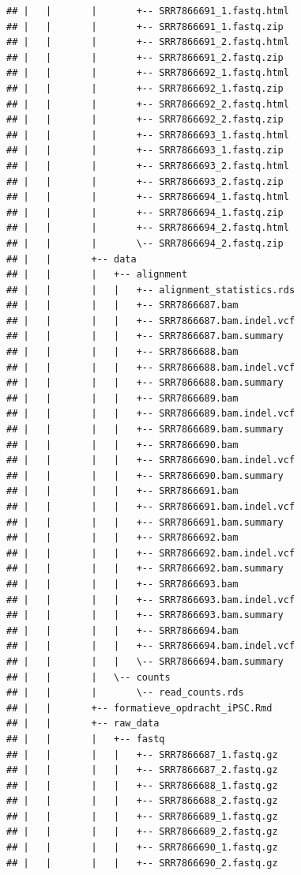\documentclass[
]{book}
\begin{document}
\begin{verbatim}
## |   |       |       +-- SRR7866691_1.fastq.html
## |   |       |       +-- SRR7866691_1.fastq.zip
## |   |       |       +-- SRR7866691_2.fastq.html
## |   |       |       +-- SRR7866691_2.fastq.zip
## |   |       |       +-- SRR7866692_1.fastq.html
## |   |       |       +-- SRR7866692_1.fastq.zip
## |   |       |       +-- SRR7866692_2.fastq.html
## |   |       |       +-- SRR7866692_2.fastq.zip
## |   |       |       +-- SRR7866693_1.fastq.html
## |   |       |       +-- SRR7866693_1.fastq.zip
## |   |       |       +-- SRR7866693_2.fastq.html
## |   |       |       +-- SRR7866693_2.fastq.zip
## |   |       |       +-- SRR7866694_1.fastq.html
## |   |       |       +-- SRR7866694_1.fastq.zip
## |   |       |       +-- SRR7866694_2.fastq.html
## |   |       |       \-- SRR7866694_2.fastq.zip
## |   |       +-- data
## |   |       |   +-- alignment
## |   |       |   |   +-- alignment_statistics.rds
## |   |       |   |   +-- SRR7866687.bam
## |   |       |   |   +-- SRR7866687.bam.indel.vcf
## |   |       |   |   +-- SRR7866687.bam.summary
## |   |       |   |   +-- SRR7866688.bam
## |   |       |   |   +-- SRR7866688.bam.indel.vcf
## |   |       |   |   +-- SRR7866688.bam.summary
## |   |       |   |   +-- SRR7866689.bam
## |   |       |   |   +-- SRR7866689.bam.indel.vcf
## |   |       |   |   +-- SRR7866689.bam.summary
## |   |       |   |   +-- SRR7866690.bam
## |   |       |   |   +-- SRR7866690.bam.indel.vcf
## |   |       |   |   +-- SRR7866690.bam.summary
## |   |       |   |   +-- SRR7866691.bam
## |   |       |   |   +-- SRR7866691.bam.indel.vcf
## |   |       |   |   +-- SRR7866691.bam.summary
## |   |       |   |   +-- SRR7866692.bam
## |   |       |   |   +-- SRR7866692.bam.indel.vcf
## |   |       |   |   +-- SRR7866692.bam.summary
## |   |       |   |   +-- SRR7866693.bam
## |   |       |   |   +-- SRR7866693.bam.indel.vcf
## |   |       |   |   +-- SRR7866693.bam.summary
## |   |       |   |   +-- SRR7866694.bam
## |   |       |   |   +-- SRR7866694.bam.indel.vcf
## |   |       |   |   \-- SRR7866694.bam.summary
## |   |       |   \-- counts
## |   |       |       \-- read_counts.rds
## |   |       +-- formatieve_opdracht_iPSC.Rmd
## |   |       +-- raw_data
## |   |       |   +-- fastq
## |   |       |   |   +-- SRR7866687_1.fastq.gz
## |   |       |   |   +-- SRR7866687_2.fastq.gz
## |   |       |   |   +-- SRR7866688_1.fastq.gz
## |   |       |   |   +-- SRR7866688_2.fastq.gz
## |   |       |   |   +-- SRR7866689_1.fastq.gz
## |   |       |   |   +-- SRR7866689_2.fastq.gz
## |   |       |   |   +-- SRR7866690_1.fastq.gz
## |   |       |   |   +-- SRR7866690_2.fastq.gz

\end{verbatim}
\end{document}
